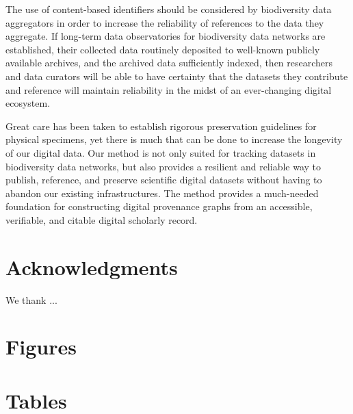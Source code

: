 \documentclass[12pt,letterpaper]{article}
\begin{document}
The use of content-based identifiers should be considered by biodiversity data aggregators in order to increase the reliability of references to the data they aggregate. If long-term data observatories for biodiversity data networks are established, their collected data routinely deposited to well-known publicly available archives, and the archived data sufficiently indexed, then researchers and data curators will be able to have certainty that the datasets they contribute and reference will maintain reliability in the midst of an ever-changing digital ecosystem. 

Great care has been taken to establish rigorous preservation guidelines for physical specimens, yet there is much that can be done to increase the longevity of our digital data. Our method is not only suited for tracking datasets in biodiversity data networks, but also provides a resilient and reliable way to publish, reference, and preserve scientific digital datasets without having to abandon our existing infrastructures. The method provides a much-needed foundation for constructing digital provenance graphs from an accessible, verifiable, and citable digital scholarly record. 


\section*{Acknowledgments}
We thank ...

\nolinenumbers







\newpage
\section*{Figures}








\newpage
\section*{Tables}


\end{document}
